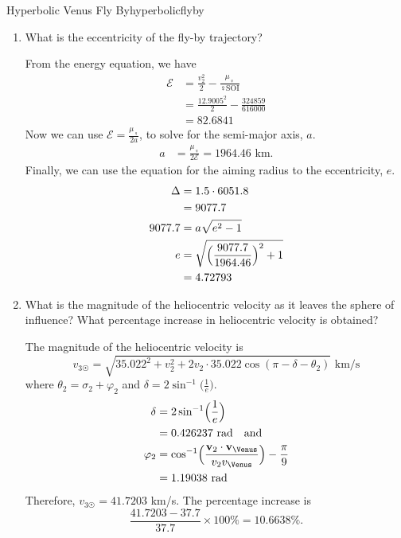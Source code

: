\begin{examples}{Hyperbolic Venus Fly By}{hyperbolicflyby}
\begin{enumerate}[label = (\alph*)]
\begin{align*}
      & = 0.404412\hat{\mathbf{i}} - 12.8942\hat{\mathbf{j}} +
        0\hat{\mathbf{k}}
    \end{align*}
    So the relative arrival speed to Venus is
    \(\lVert\mathbf{v}_2\rVert = \sqrt{0.404412^2 + 12.8942^2} = 12.9005\)
    km/s which is also the departure speed.
  \item
    What is the eccentricity of the fly-by trajectory?
    \par\smallskip
    From the energy equation, we have
    \begin{align*} 
      \mathcal{E} & = \frac{v_2^2}{2}
                    - \frac{\mu_{\Venus}}{\Venus\text{SOI}}\\
                  & = \frac{12.9005^2}{2} - \frac{324859}{616000}\\
                  & = 82.6841
    \end{align*}
    Now we can use \(\mathcal{E} = \frac{\mu_{\Venus}}{2a}\), to solve for the 
    semi-major axis, \(a\).
    \begin{align*} 
      a & = \frac{\mu_{\Venus}}{2\mathcal{E}} = 1964.46\text{ km}.
    \end{align*}
    Finally, we can use the equation for the aiming radius to the
    eccentricity, \(e\).
    \begin{align*} 
      \Delta & = 1.5\cdot 6051.8\\
             & = 9077.7\\
      9077.7 & = a\sqrt{e^2 - 1}\\
      e & = \sqrt{\Bigl(\frac{9077.7}{1964.46}\Bigr)^2 + 1}\\
             & = 4.72793
    \end{align*}
  \item
    What is the magnitude of the heliocentric velocity as it leaves the sphere
    of influence? What percentage increase in heliocentric velocity is
    obtained?
    \par\smallskip
    The magnitude of the heliocentric velocity is 
    \[ 
    v_{3\Sun} = \sqrt{35.022^2 + v_2^2 + 2v_2\cdot 35.022
      \cos(\pi - \delta - \theta_2)}\text{ km}/\text{s}
    \] 
    where \(\theta_2 = \sigma_2 + \varphi_2\) and
    \(\delta = 2\sin^{-1}\bigl(\frac{1}{e}\bigr)\).
    \begin{align*} 
      \delta & = 2\sin^{-1}\Bigl(\frac{1}{e}\Bigr)\\
             & = 0.426237\text{ rad}\quad\text{and}\quad\\
      \varphi_2 & = \cos^{-1}\Bigl(\frac{\mathbf{v}_2\cdot
                  \mathbf{v}_{\Venus}}{v_2v_{\Venus}}\Bigr) - \frac{\pi}{9}\\
             & = 1.19038\text{ rad}
    \end{align*}
    Therefore, \(v_{3\Sun} = 41.7203\) km/s.
    The percentage increase is
    \[
    \frac{41.7203 - 37.7}{37.7}\times 100\% = 10.6638\%.
    \]
  \end{enumerate}
\end{examples}
